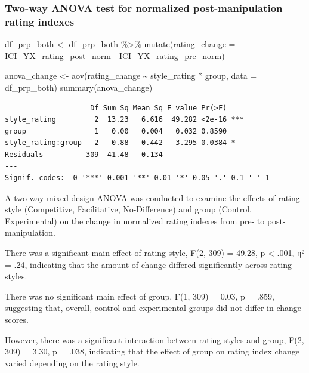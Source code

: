 \documentclass[
  letterpaper,
  DIV=11,
  numbers=noendperiod]{scrartcl}
\newenvironment{Shaded}{\begin{snugshade}}{\end{snugshade}}
\newcommand{\AttributeTok}[1]{\textcolor[rgb]{0.40,0.45,0.13}{#1}}
\newcommand{\FunctionTok}[1]{\textcolor[rgb]{0.28,0.35,0.67}{#1}}
\newcommand{\NormalTok}[1]{\textcolor[rgb]{0.00,0.23,0.31}{#1}}
\newcommand{\OtherTok}[1]{\textcolor[rgb]{0.00,0.23,0.31}{#1}}
\newcommand{\SpecialCharTok}[1]{\textcolor[rgb]{0.37,0.37,0.37}{#1}}
\begin{document}
\subsubsection{Two-way ANOVA test for normalized post-manipulation
rating
indexes}\label{two-way-anova-test-for-normalized-post-manipulation-rating-indexes}

\begin{Shaded}
\begin{Highlighting}[]
\NormalTok{df\_prp\_both }\OtherTok{\textless{}{-}}\NormalTok{ df\_prp\_both }\SpecialCharTok{\%\textgreater{}\%}
  \FunctionTok{mutate}\NormalTok{(}\AttributeTok{rating\_change =}\NormalTok{ ICI\_YX\_rating\_post\_norm }\SpecialCharTok{{-}}\NormalTok{ ICI\_YX\_rating\_pre\_norm)}

\NormalTok{anova\_change }\OtherTok{\textless{}{-}} \FunctionTok{aov}\NormalTok{(rating\_change }\SpecialCharTok{\textasciitilde{}}\NormalTok{ style\_rating }\SpecialCharTok{*}\NormalTok{ group, }\AttributeTok{data =}\NormalTok{ df\_prp\_both)}
\FunctionTok{summary}\NormalTok{(anova\_change)}
\end{Highlighting}
\end{Shaded}

\begin{verbatim}
                    Df Sum Sq Mean Sq F value Pr(>F)    
style_rating         2  13.23   6.616  49.282 <2e-16 ***
group                1   0.00   0.004   0.032 0.8590    
style_rating:group   2   0.88   0.442   3.295 0.0384 *  
Residuals          309  41.48   0.134                   
---
Signif. codes:  0 '***' 0.001 '**' 0.01 '*' 0.05 '.' 0.1 ' ' 1
\end{verbatim}

A two-way mixed design ANOVA was conducted to examine the effects of
rating style (Competitive, Facilitative, No-Difference) and group
(Control, Experimental) on the change in normalized rating indexes from
pre- to post-manipulation.

There was a significant main effect of rating style, F(2, 309) = 49.28,
p \textless{} .001, η² = .24, indicating that the amount of change
differed significantly across rating styles.

There was no significant main effect of group, F(1, 309) = 0.03, p =
.859, suggesting that, overall, control and experimental groups did not
differ in change scores.

However, there was a significant interaction between rating styles and
group, F(2, 309) = 3.30, p = .038, indicating that the effect of group
on rating index change varied depending on the rating style.
\end{document}
